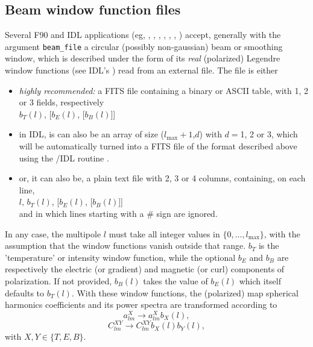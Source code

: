 \documentclass[12pt,twoside]{article}
\renewcommand{\ell}{l}
\newcommand{\lmax}{\ell_{\mathrm{max}}}
\begin{document}
\subsection{Beam window function files}
\label{fac:subsec:beamfiles}
Several F90 and IDL applications (eg,
, 
, 
, 
, 
, 
, 
)
accept, generally with the argument {\tt beam\_file} a circular (possibly non-gaussian) beam or smoothing window,
which is described under the form of its {\em real} (polarized) Legendre window functions
(see IDL's )
read from an external file.\label{page:beamfiles}
The file is either 
\begin{itemize}
\item 
{\em highly recommended:} a FITS file containing a binary or ASCII table, with 1, 2 or 3 fields, respectively\\
$b_T(\ell)$, [$b_E(\ell)$, [$b_B(\ell)$]]
\item 
 in IDL, is can also be an array of size ($\lmax+1$,$d$) with $d=$1, 2 or 3, which will be 
automatically turned into a FITS file of the format described above using the 
\healpixns/IDL routine .
\item 
or, it can also be, a plain text file with 2, 3 or 4 columns, containing, on each line,  \\
$\ell$, $b_T(\ell)$, [$b_E(\ell)$, [$b_B(\ell)$]]\\ 
and in which lines starting with a \# sign are ignored.
\end{itemize}
In any case, 
the multipole $\ell$ must take all integer values in $\{0,\ldots,\lmax\}$, 
with the assumption that the window functions vanish outside that range.
$b_T$ is the 'temperature' or intensity window function, 
while the optional $b_E$ and $b_B$ are respectively the electric (or gradient) and
magnetic (or curl) components of polarization.
If not provided, $b_B(\ell)$ takes the value of $b_E(\ell)$ which itself defaults to $b_T(\ell)$.
With these window functions, the (polarized) 
map spherical harmonics coefficients and its power spectra are transformed according to
\begin{equation}
	a^{X}_{\ell m} \longrightarrow a^{X}_{\ell m} b_{X}(\ell),
\end{equation}
\begin{equation}
	C^{XY}_{\ell m} \longrightarrow C^{XY}_{\ell m} b_{X}(\ell)b_{Y}(\ell),
\end{equation}
with $X,Y \in \{T,E,B\}$.
\end{document}
